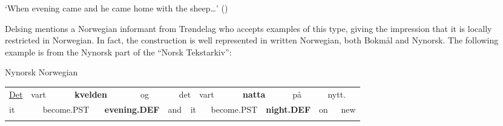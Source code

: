 \begin{styleTranslation}
‘When evening came and he came home with the sheep…’ (\citet[38]{Lundell1936})

\end{styleTranslation}

\begin{styleBodyTextFirst}
Delsing mentions a Norwegian informant from Trøndelag who accepts examples of this type, giving the impression that it is locally restricted in Norwegian. In fact, the construction is well represented in written Norwegian, both Bokmål and Nynorsk. The following example is from the Nynorsk part of the “Norsk Tekstarkiv”: 

\end{styleBodyTextFirst}

\begin{listWWNumileveli}
\item {}

\begin{styleExample}
Nynorsk Norwegian

\end{styleExample}

\end{listWWNumileveli}

\begin{tabular}{llllllllllllllllll}
\lsptoprule
\hyperlink{here}{Det} & \multicolumn{2}{l}{vart

} & \multicolumn{2}{l}{{\bfseries kvelden}

} & \multicolumn{2}{l}{og

} & \multicolumn{2}{l}{det

} & \multicolumn{2}{l}{vart

} & \multicolumn{2}{l}{{\bfseries natta}

} & \multicolumn{2}{l}{på

} & \multicolumn{2}{l}{nytt.

} & \\
\multicolumn{2}{l}{it

} & \multicolumn{2}{l}{become.PST

} & \multicolumn{2}{l}{{\bfseries evening.DEF}

} & \multicolumn{2}{l}{and

} & \multicolumn{2}{l}{it

} & \multicolumn{2}{l}{become.PST

} & \multicolumn{2}{l}{{\bfseries night.DEF}

} & \multicolumn{2}{l}{on

} & \multicolumn{2}{l}{new

}\\
\lspbottomrule
\end{tabular}

